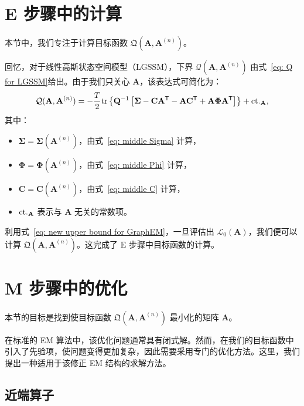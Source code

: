 \section{E 步骤中的计算}

本节中，我们专注于计算目标函数 \(\mathfrak{Q}(\mathbf{A}, \mathbf{A}^{(n)})\)。

回忆，对于线性高斯状态空间模型（LGSSM），下界 \(\mathcal{Q}(\mathbf{A}, \mathbf{A}^{(n)})\) 由式~\eqref{eq: Q for LGSSM}给出。由于我们只关心 \(\mathbf{A}\)，该表达式可简化为：
\begin{align}
    \mathcal{Q}(\mathbf{A}, \mathbf{A}^{(n)}) = - \frac{T}{2} \textrm{tr} \left\{ \mathbf{Q}^{-1} \left[ \boldsymbol{\Sigma} - \mathbf{C} \mathbf{A}^{\mathsf{T}} - \mathbf{A} \mathbf{C}^{\mathsf{T}} + \mathbf{A} \boldsymbol{\Phi} \mathbf{A}^{\mathsf{T}} \right] \right\} + \mathrm{ct.}_{\mathbf{A}},
\end{align}
其中：
\begin{itemize}
    \item \(\boldsymbol{\Sigma} = \boldsymbol{\Sigma}(\mathbf{A}^{(n)})\)，由式~\eqref{eq: middle Sigma} 计算，
    \item \(\boldsymbol{\Phi} = \boldsymbol{\Phi}(\mathbf{A}^{(n)})\)，由式~\eqref{eq: middle Phi} 计算，
    \item \(\mathbf{C} = \mathbf{C}(\mathbf{A}^{(n)})\)，由式~\eqref{eq: middle C} 计算，
    \item \(\mathrm{ct.}_{\mathbf{A}}\) 表示与 \(\mathbf{A}\) 无关的常数项。
\end{itemize}

利用式~\eqref{eq: new upper bound for GraphEM}，一旦评估出 \(\mathcal{L}_0(\mathbf{A})\)，我们便可以计算 \(\mathfrak{Q}(\mathbf{A}, \mathbf{A}^{(n)})\)。这完成了 E 步骤中目标函数的计算。

\section{M 步骤中的优化}

本节的目标是找到使目标函数 \(\mathfrak{Q}(\mathbf{A}, \mathbf{A}^{(n)})\) 最小化的矩阵 \(\mathbf{A}\)。

在标准的 EM 算法中，该优化问题通常具有闭式解。然而，在我们的目标函数中引入了先验项，使问题变得更加复杂，因此需要采用专门的优化方法。这里，我们提出一种适用于该修正 EM 结构的求解方法。

\subsection{近端算子}

